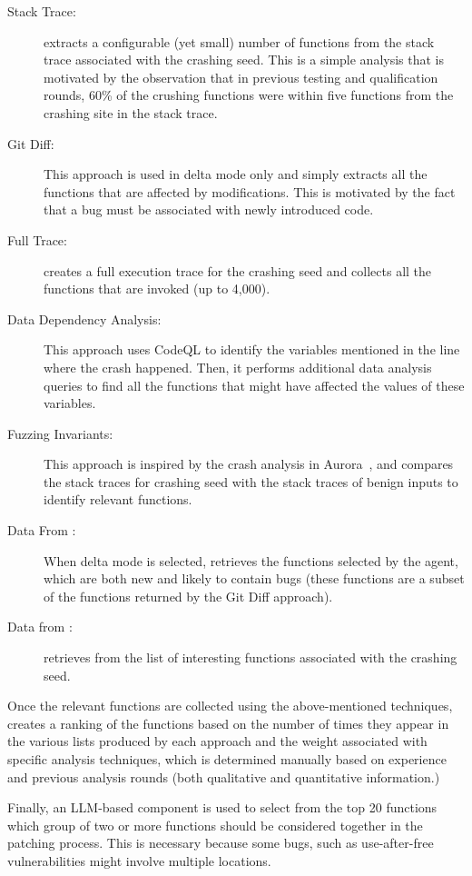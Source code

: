 \begin{description}
\item[Stack Trace:] \kumushi{} extracts a configurable (yet small) number of functions from the stack trace associated with the crashing seed.
This is a simple analysis that is motivated by the observation that in previous testing and qualification rounds, 60\% of the crushing functions were within five functions from the crashing site in the stack trace.
\item[Git Diff:] This approach is used in delta mode only and simply extracts all the functions that are affected by modifications. This is motivated by the fact that a bug must be associated with newly introduced code.
\item[Full Trace:] \kumushi{} creates a full execution trace for the crashing seed and collects all the functions that are invoked (up to 4,000).
\item[Data Dependency Analysis:] This approach uses CodeQL to identify the variables mentioned in the line where the crash happened.
Then, it performs additional data analysis queries to find all the functions that might have affected the values of these variables.
\item[Fuzzing Invariants:] This approach is inspired by the crash analysis in Aurora~\cite{aurora}, and compares the stack traces for crashing seed with the stack traces of benign inputs to identify relevant functions.
\item[Data From \diffguy:] When delta mode is selected, \kumushi{} retrieves the functions selected by the \diffguy agent, which are both new and likely to contain bugs (these functions are a subset of the functions returned by the Git Diff approach).
\item[Data from \dyva:] \kumushi{} retrieves from \dyva{} the list of interesting functions associated with the crashing seed.
\end{description}

Once the relevant functions are collected using the above-mentioned techniques, \kumushi{} creates a ranking of the functions based on the number of times they appear in the various lists produced by each approach and the weight associated with specific analysis techniques, which is determined manually based on experience and previous analysis rounds (both qualitative and quantitative information.)

Finally, an LLM-based component is used to select from the top 20 functions which group of two or more functions should be considered together in the patching process.
This is necessary because some bugs, such as use-after-free vulnerabilities might involve multiple locations.


